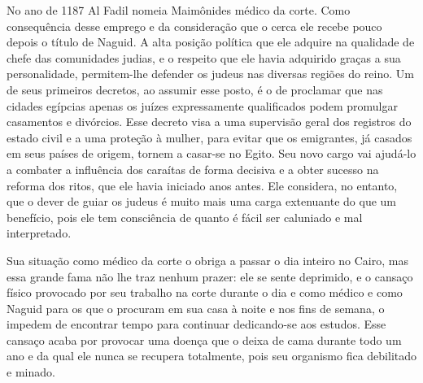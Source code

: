 No ano de 1187 Al Fadil nomeia Maimônides médico da corte. Como
consequência desse emprego e da consideração que o cerca ele recebe
pouco depois o título de Naguid. A alta posição política que ele adquire
na qualidade de chefe das comunidades judias, e o respeito que ele havia
adquirido graças a sua personalidade, permitem-lhe defender os judeus
nas diversas regiões do reino. Um de seus primeiros decretos, ao assumir
esse posto, é o de proclamar que nas cidades egípcias apenas os juízes
expressamente qualificados podem promulgar casamentos e divórcios. Esse
decreto visa a uma supervisão geral dos registros do estado civil e a
uma proteção à mulher, para evitar que os emigrantes, já casados em
seus países de origem, tornem a casar-se no Egito. Seu novo cargo vai
ajudá-lo a combater a influência dos caraítas de forma decisiva e a
obter sucesso na reforma dos ritos, que ele havia iniciado anos antes.
Ele considera, no entanto, que o dever de guiar os judeus é muito mais
uma carga extenuante do que um benefício, pois ele tem consciência de
quanto é fácil ser caluniado e mal interpretado.

Sua situação como médico da corte o obriga a passar o dia inteiro no
Cairo, mas essa grande fama não lhe traz nenhum prazer: ele se sente
deprimido, e o cansaço físico provocado por seu trabalho na corte
durante o dia e como médico e como Naguid para os que o procuram em sua
casa à noite e nos fins de semana, o impedem de encontrar tempo para
continuar dedicando-se aos estudos. Esse cansaço acaba por provocar uma
doença que o deixa de cama durante todo um ano e da qual ele nunca se
recupera totalmente, pois seu organismo fica debilitado e minado.

